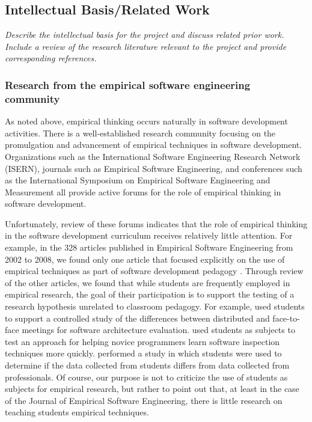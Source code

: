 \subsection{Intellectual Basis/Related Work}

{\em Describe the intellectual basis for the project and discuss related
prior work.  Include a review of the research literature relevant to the
project and provide corresponding references. }

\bigskip

\subsubsection{Research from the empirical software engineering community}

As noted above, empirical thinking occurs naturally in software development
activities.  There is a well-established research community focusing on the
promulgation and advancement of empirical techniques in software
development.  Organizations such as the International Software Engineering
Research Network (ISERN), journals such as Empirical Software Engineering,
and conferences such as the International Symposium on Empirical Software
Engineering and Measurement all provide active forums for the role of
empirical thinking in software development.

Unfortunately, review of these forums indicates that the role of empirical
thinking in the software development curriculum receives relatively little
attention.  For example, in the 328 articles published in Empirical
Software Engineering from 2002 to 2008, we found only one article that
focused explicitly on the use of empirical techniques as part of software
development pedagogy \cite{Pfahl03}.  Through review of the other articles,
we found that while students are frequently employed in empirical research,
the goal of their participation is to support the testing of a research
hypothesis unrelated to classroom pedagogy.  For example, \cite{Babar08}
used students to support a controlled study of the differences between
distributed and face-to-face meetings for software architecture evaluation.
\cite{Carver06} used students as subjects to test an approach for helping
novice programmers learn software inspection techniques more quickly.
\cite{Host00} performed a study in which students were used to determine if
the data collected from students differs from data collected from
professionals.  Of course, our purpose is not to criticize the use of
students as subjects for empirical research, but rather to point out that,
at least in the case of the Journal of Empirical Software Engineering,
there is little research on teaching students empirical techniques.

